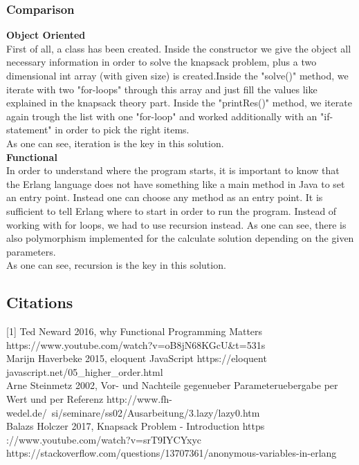 \subsubsection{Comparison}
\textbf{Object Oriented}\\
First of all, a class has been created. Inside the constructor we give the object all necessary information in order to solve the knapsack problem, plus a two dimensional int array (with given size) is created.Inside the "solve()" method, we iterate with two "for-loops" through this array and just fill the values like explained in the knapsack theory part. Inside the "printRes()" method, we iterate again trough the list with one "for-loop" and worked additionally with an "if-statement" in order to pick the right items.\\
As one can see, iteration is the key in this solution.\\
\textbf{Functional}\\
In order to understand where the program starts, it is important to know that the Erlang language does not have something like a main method in Java to set an entry point. Instead one can choose any method as an entry point. It is sufficient to tell Erlang where to start in order to run the program. Instead of working with for loops, we had to use recursion instead. As one can see, there is also polymorphism implemented for the calculate solution depending on the given parameters.\\
As one can see, recursion is the key in this solution.

\subsection{Citations}
[1] Ted Neward 2016, why Functional Programming Matters https://www.youtube.com/watch?v=oB8jN68KGcU&t=531s\\
[2] Marijn Haverbeke 2015, eloquent JavaScript https://eloquent javascript.net/05\_higher\_order.html\\
[3] Arne Steinmetz 2002, Vor- und Nachteile gegenueber Parameteruebergabe per Wert und per Referenz http://www.fh-wedel.de/~si/seminare/ss02/Ausarbeitung/3.lazy/lazy0.htm\\
[4] Balazs Holczer 2017, Knapsack Problem - Introduction https ://www.youtube.com/watch?v=srT9IYCYxyc\\
[5] https://stackoverflow.com/questions/13707361/anonymous-variables-in-erlang \\


